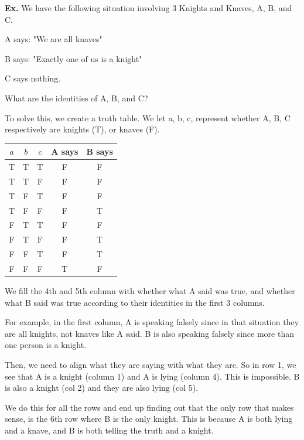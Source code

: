 \documentclass[12pt,letterpaper]{article} \usepackage{amsmath} \usepackage{graphicx}  \usepackage{longtable}  \usepackage{amssymb}
\begin{document}
        \begin{mdframed}
            \textbf{Ex. } We have the following situation involving 3 Knights and Knaves, A, B, and C.

            A says: "We are all knaves"
            
            B says: "Exactly one of us is a knight"

            C says nothing.

            What are the identities of A, B, and C?

            To solve this, we create a truth table. We let a, b, c, represent whether A, B, C respectively are knights (T), or knaves (F).

            \begin{centering}
                \begin{tabular}{c c c|c|c}
                    \textbf{$a$} & \textbf{$b$} & \textbf{$c$} & \textbf{A says} & \textbf{B says} \\
                    \hline
                    T & T & T & F & F\\
                    T & T & F & F & F\\
                    T & F & T & F & F\\
                    T & F & F & F & T\\
                    F & T & T & F & F\\
                    F & T & F & F & T\\
                    F & F & T & F & T\\
                    F & F & F & T & F\\
                \end{tabular}

            \end{centering}

            We fill the 4th and 5th column with whether what A said was true, and whether what B said was true according to their identities in the first 3 columns. 

            For example, in the first column, A is speaking falsely since in that situation they are all knights, not knaves like A said. B is also speaking falsely since more than one person is a knight. 

            Then, we need to align what they are saying with what they are. So in row 1, we see that A is a knight (column 1) and A is lying (column 4). This is impossible. B is also a knight (col 2) and they are also lying (col 5).

            We do this for all the rows and end up finding out that the only row that makes sense, is the 6th row where B is the only knight. This is because A is both lying and a knave, and B is  both telling the truth and a knight. 

        \end{mdframed}
\end{document}
